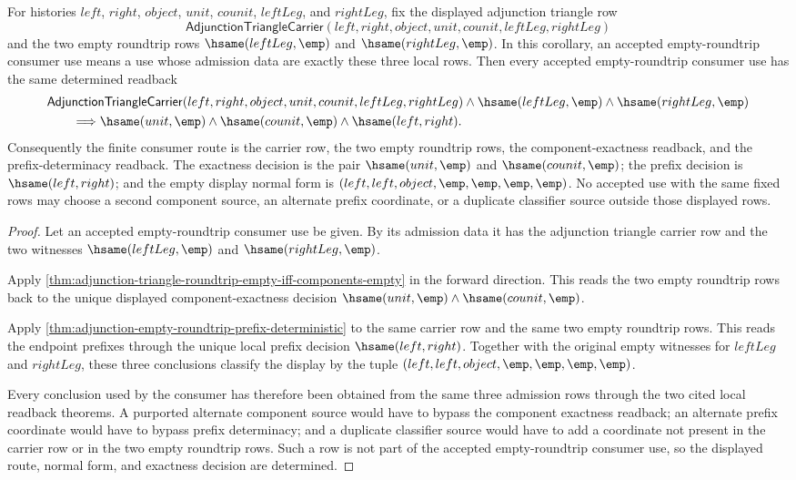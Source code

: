 \begin{corollary}
\label{cor:adjunction-triangle-empty-roundtrip-consumer-determinacy}
For histories $left$, $right$, $object$, $unit$, $counit$, $leftLeg$, and
$rightLeg$, fix the displayed adjunction triangle row
$$
\mathsf{AdjunctionTriangleCarrier}(left,right,object,unit,counit,leftLeg,rightLeg)
$$
and the two empty roundtrip rows $\hsame(leftLeg,\emp)$ and
$\hsame(rightLeg,\emp)$. In this corollary, an accepted empty-roundtrip
consumer use means a use whose admission data are exactly these three local
rows. Then every accepted empty-roundtrip consumer use has the same determined
readback
$$
\begin{aligned}
&\mathsf{AdjunctionTriangleCarrier}(left,right,object,unit,counit,leftLeg,rightLeg)
\land \hsame(leftLeg,\emp)\land \hsame(rightLeg,\emp)\\
&\qquad\Longrightarrow
\hsame(unit,\emp)\land \hsame(counit,\emp)\land \hsame(left,right).
\end{aligned}
$$
Consequently the finite consumer route is the carrier row, the two empty
roundtrip rows, the component-exactness readback, and the prefix-determinacy
readback. The exactness decision is the pair
$\hsame(unit,\emp)$ and $\hsame(counit,\emp)$; the prefix decision is
$\hsame(left,right)$; and the empty display normal form is
$(left,left,object,\emp,\emp,\emp,\emp)$. No accepted use with the same fixed
rows may choose a second component source, an alternate prefix coordinate, or a
duplicate classifier source outside those displayed rows.
\end{corollary}
\begin{proof}
Let an accepted empty-roundtrip consumer use be given. By its admission data it
has the adjunction triangle carrier row and the two witnesses
$\hsame(leftLeg,\emp)$ and $\hsame(rightLeg,\emp)$.

Apply \autoref{thm:adjunction-triangle-roundtrip-empty-iff-components-empty} in
the forward direction. This reads the two empty roundtrip rows back to the
unique displayed component-exactness decision
$\hsame(unit,\emp)\land\hsame(counit,\emp)$.

Apply \autoref{thm:adjunction-empty-roundtrip-prefix-deterministic} to the same
carrier row and the same two empty roundtrip rows. This reads the endpoint
prefixes through the unique local prefix decision $\hsame(left,right)$.
Together with the original empty witnesses for $leftLeg$ and $rightLeg$, these
three conclusions classify the display by the tuple
$(left,left,object,\emp,\emp,\emp,\emp)$.

Every conclusion used by the consumer has therefore been obtained from the
same three admission rows through the two cited local readback theorems. A
purported alternate component source would have to bypass the component
exactness readback; an alternate prefix coordinate would have to bypass prefix
determinacy; and a duplicate classifier source would have to add a coordinate
not present in the carrier row or in the two empty roundtrip rows. Such a row is
not part of the accepted empty-roundtrip consumer use, so the displayed route,
normal form, and exactness decision are determined.
\end{proof}
